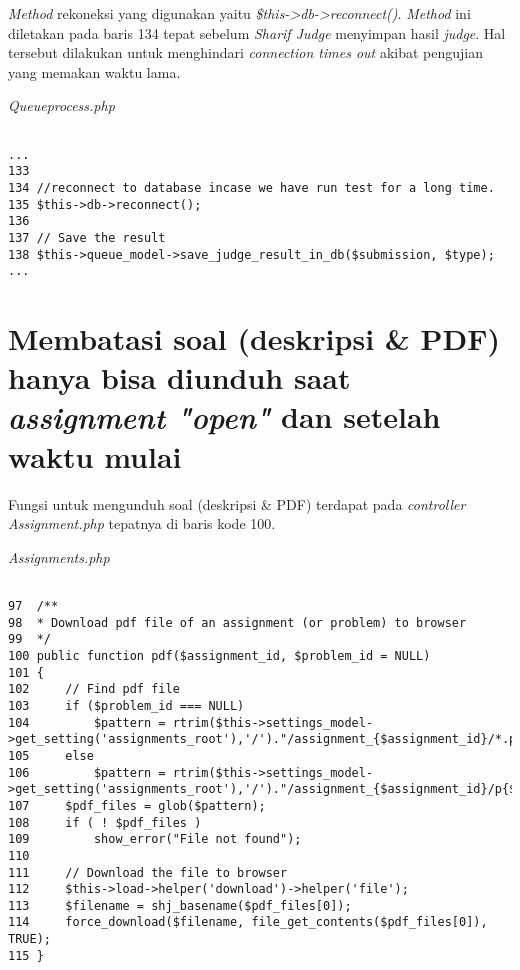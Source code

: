 \textit{Method} rekoneksi yang digunakan yaitu \textit{\$this->db->reconnect()}. \textit{Method} ini diletakan pada baris 134 tepat sebelum \textit{Sharif Judge} menyimpan hasil \textit{judge}. Hal tersebut dilakukan untuk menghindari \textit{connection times out} akibat pengujian yang memakan waktu lama.

\textit{Queueprocess.php}
\begin{lstlisting}[basicstyle=\ttfamily, frame=single,
columns=fullflexible, keepspaces=true]

...
133
134	//reconnect to database incase we have run test for a long time.
135	$this->db->reconnect();
136
137	// Save the result
138	$this->queue_model->save_judge_result_in_db($submission, $type);
...

\end{lstlisting}

\section{Membatasi soal (deskripsi \& PDF) hanya bisa diunduh saat \textit{assignment "open"} dan setelah waktu mulai}
Fungsi untuk mengunduh soal (deskripsi \& PDF) terdapat pada \textit{controller Assignment.php} tepatnya di baris kode 100.

\textit{Assignments.php}
\begin{lstlisting}[basicstyle=\ttfamily, frame=single,
columns=fullflexible, keepspaces=true, breaklines=true]

97	/**
98	* Download pdf file of an assignment (or problem) to browser
99	*/
100	public function pdf($assignment_id, $problem_id = NULL)
101	{
102		// Find pdf file
103		if ($problem_id === NULL)
104			$pattern = rtrim($this->settings_model->get_setting('assignments_root'),'/')."/assignment_{$assignment_id}/*.pdf";
105		else
106			$pattern = rtrim($this->settings_model->get_setting('assignments_root'),'/')."/assignment_{$assignment_id}/p{$problem_id}/*.pdf";
107		$pdf_files = glob($pattern);
108		if ( ! $pdf_files )
109			show_error("File not found");
110
111		// Download the file to browser
112		$this->load->helper('download')->helper('file');
113		$filename = shj_basename($pdf_files[0]);
114		force_download($filename, file_get_contents($pdf_files[0]), TRUE);
115	}

\end{lstlisting}

